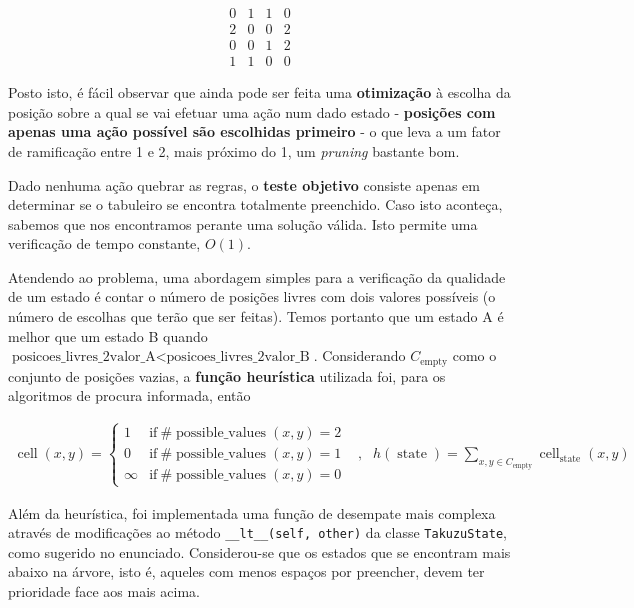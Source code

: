\documentclass[12pt,a4paper]{article}
\newcommand{\op}{\operatorname}
\begin{document}
\[
  \begin{array}{cccc}
    0 & 1 & 1 & 0 \\
    2 & 0 & 0 & 2 \\
    0 & 0 & 1 & 2 \\
    1 & 1 & 0 & 0
  \end{array}
\]

Posto isto, é fácil observar que ainda pode ser feita uma \textbf{otimização} à escolha da
posição sobre a qual se vai efetuar uma ação num dado estado -
\textbf{posições com apenas uma ação possível são escolhidas primeiro} -
o que leva a um fator de ramificação entre 1 e 2,
mais próximo do 1, um \textit{pruning} bastante bom.

Dado nenhuma ação quebrar as regras, o \textbf{teste objetivo} consiste apenas em determinar
se o tabuleiro se encontra totalmente preenchido. Caso isto aconteça, sabemos que
nos encontramos perante uma solução válida. Isto permite uma verificação de tempo constante, \(O(1)\).

Atendendo ao problema, uma abordagem simples para a verificação da qualidade de
um estado é contar o número de posições livres com dois valores possíveis
(o número de escolhas que terão que ser feitas).
Temos portanto que um estado A é melhor que um estado B quando
\(\text{posicoes\_livres\_2valor\_A} < \text{posicoes\_livres\_2valor\_B}\).
Considerando \(C_{\op{empty}}\) como o conjunto de posições vazias, a
\textbf{função heurística} utilizada foi, para os algoritmos de procura informada, então

\[
  \begin{aligned}
    \op{cell}(x, y) = \begin{cases}
                        1      & \text{if}~\#\op{possible\_values}(x, y) = 2 \\
                        0      & \text{if}~\#\op{possible\_values}(x, y) = 1 \\
                        \infty & \text{if}~\#\op{possible\_values}(x, y) = 0
                      \end{cases}
     & , &
    h(\op{state}) = \sum_{x,y\in C_{\op{empty}}} \op{cell}_{\op{state}}(x, y)
  \end{aligned}
\]

Além da heurística, foi implementada uma função de desempate mais complexa através de
modificações ao método \texttt{\_\_lt\_\_(self, other)} da classe \texttt{TakuzuState}, como sugerido no enunciado.
Considerou-se que os estados que se encontram mais abaixo na árvore, isto é, aqueles com
menos espaços por preencher, devem ter prioridade face aos mais acima.
\end{document}
